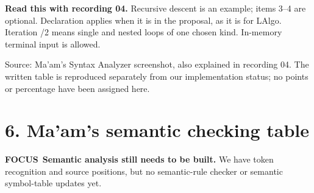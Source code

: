 \documentclass[11pt,a4paper]{article}
\newcommand{\todo}{\textcolor{focus}{\bfseries FOCUS}}
\newcommand{\boxnote}[3]{\par\smallskip\begingroup\setlength{\fboxsep}{8pt}\colorbox{#1}{\parbox{\dimexpr\linewidth-2\fboxsep\relax}{\color{#2}\small #3}}\endgroup\par\smallskip}
\newcommand{\focusbox}[1]{\boxnote{focusbg}{focus}{#1}}
\newcommand{\neutralbox}[1]{\boxnote{cream}{black}{#1}}
\begin{document}
\neutralbox{\textbf{Read this with recording 04.} Recursive descent is an example;
items 3--4 are optional. Declaration applies when it is in the proposal, as it is for LAlgo.
Iteration /2 means single and nested loops of one chosen kind. In-memory terminal input is allowed.}

{\footnotesize\color{muted}Source: Ma'am's Syntax Analyzer screenshot, also explained in
recording 04. The written table is reproduced separately from our implementation status;
no points or percentage have been assigned here.}

\clearpage
\section{6. Ma'am's semantic checking table}
\focusbox{\todo\ \textbf{Semantic analysis still needs to be built.} We have token recognition
and source positions, but no semantic-rule checker or semantic symbol-table updates yet.}
\end{document}
